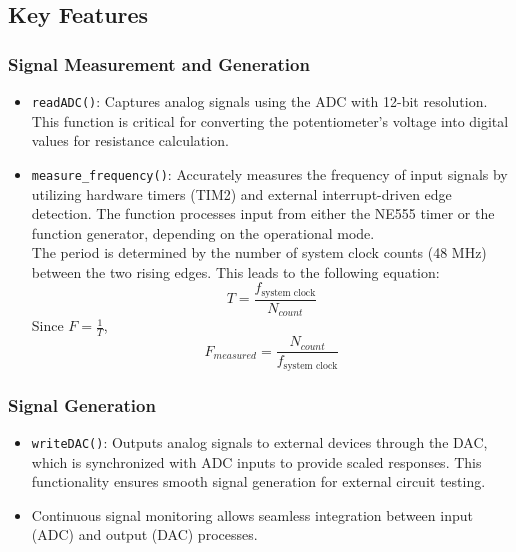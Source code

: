 \subsection{Key Features}

\subsubsection{Signal Measurement and Generation}
\begin{itemize}
    \item \texttt{readADC()}: Captures analog signals using the ADC with 12-bit resolution. This function is critical for converting the potentiometer's voltage into digital values for resistance calculation.
    \item \texttt{measure\_frequency()}: Accurately measures the frequency of input signals by utilizing hardware timers (TIM2) and external interrupt-driven edge detection. The function processes input from either the NE555 timer or the function generator, depending on the operational mode.
    \\[6pt]
    The period is determined by the number of system clock counts (48 MHz) between the two rising edges. This leads to the following equation:
    $$T = \frac{f_{\text{system clock}}}{N_{count}}$$
    Since $F = \frac{1}{T}$,
    $$F_{measured} = \frac{N_{count}}{f_{\text{system clock}}}$$
\end{itemize}

\subsubsection{Signal Generation}
\begin{itemize}
    \item \texttt{writeDAC()}: Outputs analog signals to external devices through the DAC, which is synchronized with ADC inputs to provide scaled responses. This functionality ensures smooth signal generation for external circuit testing.
    \item Continuous signal monitoring allows seamless integration between input (ADC) and output (DAC) processes.
\end{itemize}

